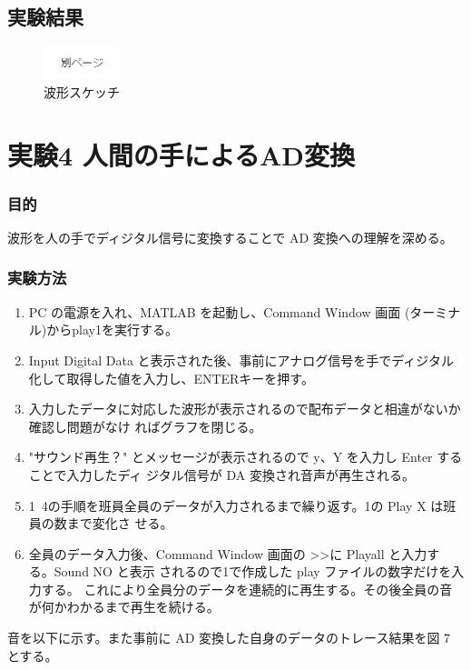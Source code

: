\documentclass[10pt]{article}
\begin{document}
\subsection{実験結果}
\begin{figure}[H]
		\centering
		\includegraphics[width=0.2\textwidth]{page.png}
		\caption{波形スケッチ}
\end{figure}

\pagebreak

\section{実験4 人間の手によるAD変換}

\subsubsection{目的}
 波形を人の手でディジタル信号に変換することで AD 変換への理解を深める。 
 
 \subsubsection{実験方法}
 \begin{enumerate}
    \item PC の電源を入れ、MATLAB を起動し、Command Window 画面 (ターミナル)からplay1を実行する。 
    \item Input Digital Data と表示された後、事前にアナログ信号を手でディジタル化して取得した値を入力し、ENTERキーを押す。
    \item 入力したデータに対応した波形が表示されるので配布データと相違がないか確認し問題がなけ ればグラフを閉じる。
    \item "サウンド再生？" とメッセージが表示されるので y、Y を入力し Enter することで入力したディ ジタル信号が DA 変換され音声が再生される。 
    \item 1~4の手順を班員全員のデータが入力されるまで繰り返す。1の Play X は班員の数まで変化さ せる。 
    \item 全員のデータ入力後、Command Window 画面の >>に Playall と入力する。Sound NO と表示 されるので1で作成した play ファイルの数字だけを入力する。 これにより全員分のデータを連続的に再生する。その後全員の音が何かわかるまで再生を続ける。
\end{enumerate}
 音を以下に示す。また事前に AD 変換した自身のデータのトレース結果を図 7 とする。 
\end{document}
